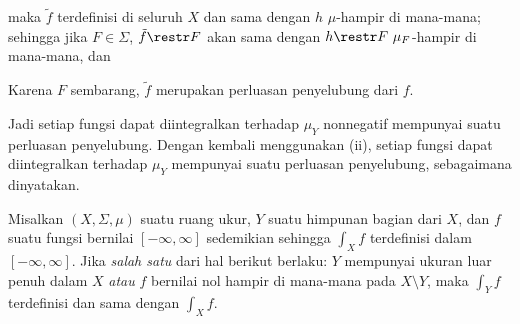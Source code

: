 {

\noindent maka $\tilde f$ terdefinisi di seluruh $X$ dan sama dengan
$h\,\,\mu$-hampir di mana-mana;  sehingga jika $F\in\Sigma$,
$\tilde f\restr F$ akan sama dengan $h\restr F\,\,\mu_F$-hampir di
mana-mana, dan


\noindent Karena $F$ sembarang, $\tilde f$ merupakan perluasan
penyelubung dari $f$.

\medskip

 Jadi setiap fungsi dapat diintegralkan terhadap $\mu_Y$ nonnegatif
mempunyai suatu perluasan penyelubung.   Dengan kembali menggunakan (ii),
setiap fungsi dapat diintegralkan terhadap $\mu_Y$ mempunyai suatu perluasan
penyelubung, sebagaimana dinyatakan.
}%

 Misalkan $(X,\Sigma,\mu)$ suatu ruang ukur, $Y$
suatu himpunan bagian dari $X$, dan $f$ suatu fungsi bernilai
$[-\infty,\infty]$ sedemikian sehingga $\int_Xf$ terdefinisi dalam
$[-\infty,\infty]$.   Jika {\it salah satu} dari hal berikut berlaku: $Y$
mempunyai ukuran luar penuh dalam $X$ {\it atau} $f$ bernilai nol hampir
di mana-mana pada $X\setminus Y$, maka $\int_Yf$ terdefinisi dan sama
dengan $\int_Xf$.

